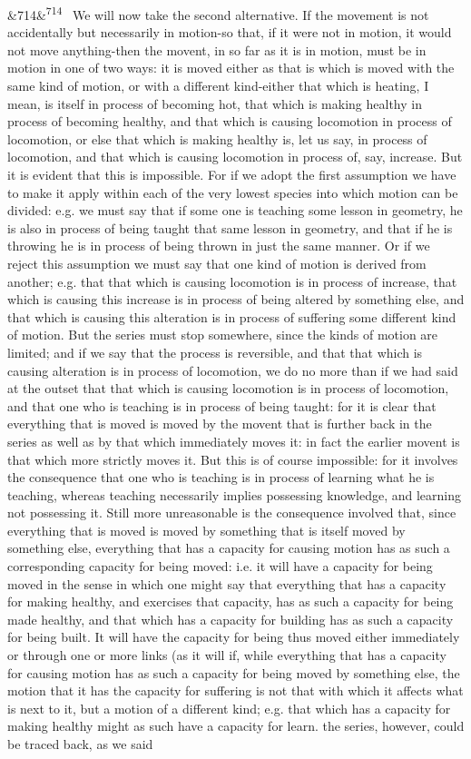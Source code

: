 \documentclass[12pt]{article}
\newcommand{\para}[1][]{\par\noindent\ifx&#1&\else\textsuperscript{\footnotesize #1}~\fi}
\begin{document}
\para[714] We will now take the second alternative. If the movement is not accidentally but necessarily in motion-so that, if it were not in motion, it would not move anything-then the movent, in so far as it is in motion, must be in motion in one of two ways: it is moved either as that is which is moved with the same kind of motion, or with a different kind-either that which is heating, I mean, is itself in process of becoming hot, that which is making healthy in process of becoming healthy, and that which is causing locomotion in process of locomotion, or else that which is making healthy is, let us say, in process of locomotion, and that which is causing locomotion in process of, say, increase. But it is evident that this is impossible. For if we adopt the first assumption we have to make it apply within each of the very lowest species into which motion can be divided: e.g. we must say that if some one is teaching some lesson in geometry, he is also in process of being taught that same lesson in geometry, and that if he is throwing he is in process of being thrown in just the same manner. Or if we reject this assumption we must say that one kind of motion is derived from another; e.g. that that which is causing locomotion is in process of increase, that which is causing this increase is in process of being altered by something else, and that which is causing this alteration is in process of suffering some different kind of motion. But the series must stop somewhere, since the kinds of motion are limited; and if we say that the process is reversible, and that that which is causing alteration is in process of locomotion, we do no more than if we had said at the outset that that which is causing locomotion is in process of locomotion, and that one who is teaching is in process of being taught: for it is clear that everything that is moved is moved by the movent that is further back in the series as well as by that which immediately moves it: in fact the earlier movent is that which more strictly moves it. But this is of course impossible: for it involves the consequence that one who is teaching is in process of learning what he is teaching, whereas teaching necessarily implies possessing knowledge, and learning not possessing it. Still more unreasonable is the consequence involved that, since everything that is moved is moved by something that is itself moved by something else, everything that has a capacity for causing motion has as such a corresponding capacity for being moved: i.e. it will have a capacity for being moved in the sense in which one might say that everything that has a capacity for making healthy, and exercises that capacity, has as such a capacity for being made healthy, and that which has a capacity for building has as such a capacity for being built. It will have the capacity for being thus moved either immediately or through one or more links (as it will if, while everything that has a capacity for causing motion has as such a capacity for being moved by something else, the motion that it has the capacity for suffering is not that with which it affects what is next to it, but a motion of a different kind; e.g. that which has a capacity for making healthy might as such have a capacity for learn. the series, however, could be traced back, as we said 
\end{document}

